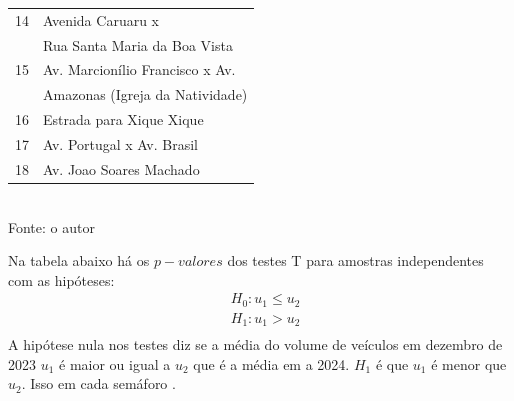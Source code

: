 \begin{quadro}[H]
\begin{tabular}{|c|l|}
14 & Avenida Caruaru x\\& Rua Santa Maria da Boa Vista \\ \hline
15 & Av. Marcionílio Francisco x Av.\\& Amazonas (Igreja da Natividade) \\ \hline
16 & Estrada para Xique Xique \\ \hline
17 & Av. Portugal x Av. Brasil \\ \hline
18 & Av. Joao Soares Machado \\ \hline
\end{tabular}
{\footnotesize\\ Fonte: o autor}
\label{tab:enderecos}
\end{quadro}

Na tabela abaixo há os \(p-valores\) dos testes T para amostras independentes com as hipóteses:
\begin{equation*}
    \begin{aligned}
     &H_0: u_1 \leq u_2\\
     &H_1: u_1 > u_2\\
    \end{aligned}
\end{equation*}
A hipótese nula nos testes diz se a média  do volume de veículos em dezembro de 2023 \(u_1\) é maior ou igual a \(u_2\) que é a média em a 2024. \(H_1\) é  que \(u_1\) é menor que  \(u_2\). Isso em cada semáforo .

